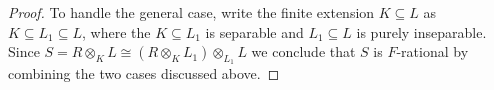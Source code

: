 \documentclass[10pt,a4paper]{amsart}
\begin{document}
\begin{proof}
    To handle the general case, write the finite extension $K \subseteq L$ as $K \subseteq L_1 \subseteq L$, where the $K \subseteq L_1$ is separable and $L_1 \subseteq L$ is purely inseparable. Since $S = R \otimes_K L \cong (R \otimes_K L_1) \otimes_{L_1} L$ we conclude that $S$ is $F$-rational by combining the two cases discussed above.
\end{proof}
\end{document}
